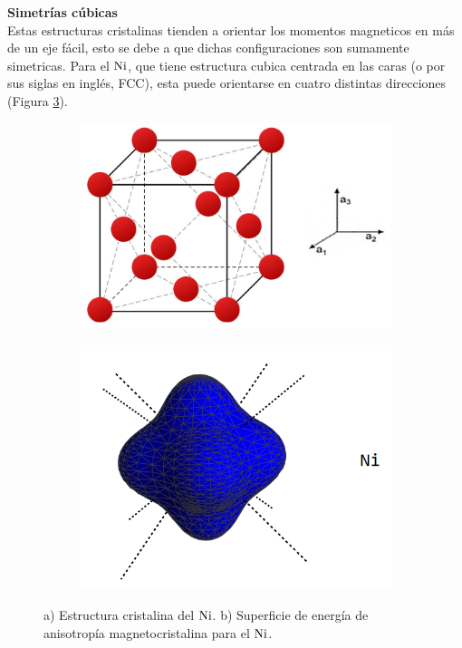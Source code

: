\vspace{10pt}

\textbf{Simetrías cúbicas}\\
Estas estructuras cristalinas tienden a orientar los momentos magneticos en más de un eje fácil, esto se debe a que dichas configuraciones son sumamente simetricas. Para el $\ce{Ni}$, que tiene estructura cubica centrada en las caras (o por sus siglas en inglés, FCC), esta puede orientarse en cuatro distintas direcciones (Figura \ref{fig:niquel}).
\begin{figure}[!hpt]
    \centering
    \begin{subfigure}[b]{0.45\textwidth}
        \includegraphics[scale=0.45]{Figuras/Crystal-fcc.png}
        \caption{}
        \label{fig:fcc}
    \end{subfigure}
    \begin{subfigure}[b]{0.4\textwidth}
        \includegraphics[scale=0.35]{Figuras/MagnetocrystallineNi.png}
        \caption{}
        \label{fig:anisotropyfcc}
    \end{subfigure}
    \renewcommand{\figurename}{\textbf{Figura}}
    \renewcommand\thefigure{\textbf{\arabic{figure}}}
    \caption{a) Estructura cristalina del $\ce{Ni}$. b) Superficie de energía de anisotropía magnetocristalina para el $\ce{Ni}$.}
    \label{fig:niquel}
\end{figure}

